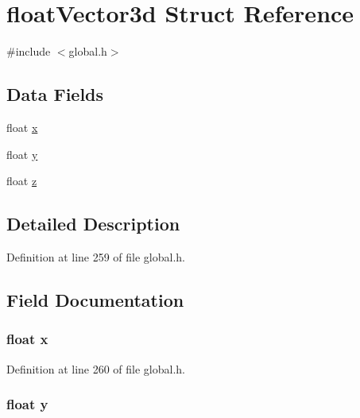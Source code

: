 \hypertarget{structfloatVector3d}{\section{float\-Vector3d Struct Reference}
\label{structfloatVector3d}
}


{\ttfamily \#include $<$global.\-h$>$}

\subsection*{Data Fields}
\begin{DoxyCompactItemize}
\item 
float \hyperlink{structfloatVector3d_ad0da36b2558901e21e7a30f6c227a45e}{x}
\item 
float \hyperlink{structfloatVector3d_aa4f0d3eebc3c443f9be81bf48561a217}{y}
\item 
float \hyperlink{structfloatVector3d_af73583b1e980b0aa03f9884812e9fd4d}{z}
\end{DoxyCompactItemize}


\subsection{Detailed Description}


Definition at line 259 of file global.\-h.



\subsection{Field Documentation}
\hypertarget{structfloatVector3d_ad0da36b2558901e21e7a30f6c227a45e}{
\subsubsection[{x}]{\setlength{\rightskip}{0pt plus 5cm}float x}}\label{structfloatVector3d_ad0da36b2558901e21e7a30f6c227a45e}


Definition at line 260 of file global.\-h.

\hypertarget{structfloatVector3d_aa4f0d3eebc3c443f9be81bf48561a217}{
\subsubsection[{y}]{\setlength{\rightskip}{0pt plus 5cm}float y}}\label{structfloatVector3d_aa4f0d3eebc3c443f9be81bf48561a217}


